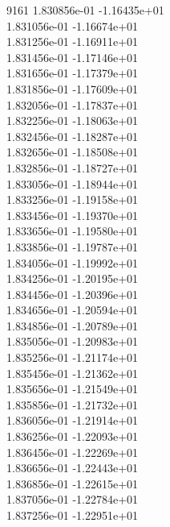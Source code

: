 9161	1.830856e-01	-1.16435e+01	\\ 	1.831056e-01	-1.16674e+01	\\ 	1.831256e-01	-1.16911e+01	\\ 	1.831456e-01	-1.17146e+01	\\ 	1.831656e-01	-1.17379e+01	\\ 	1.831856e-01	-1.17609e+01	\\ 	1.832056e-01	-1.17837e+01	\\ 	1.832256e-01	-1.18063e+01	\\ 	1.832456e-01	-1.18287e+01	\\ 	1.832656e-01	-1.18508e+01	\\ 	1.832856e-01	-1.18727e+01	\\ 	1.833056e-01	-1.18944e+01	\\ 	1.833256e-01	-1.19158e+01	\\ 	1.833456e-01	-1.19370e+01	\\ 	1.833656e-01	-1.19580e+01	\\ 	1.833856e-01	-1.19787e+01	\\ 	1.834056e-01	-1.19992e+01	\\ 	1.834256e-01	-1.20195e+01	\\ 	1.834456e-01	-1.20396e+01	\\ 	1.834656e-01	-1.20594e+01	\\ 	1.834856e-01	-1.20789e+01	\\ 	1.835056e-01	-1.20983e+01	\\ 	1.835256e-01	-1.21174e+01	\\ 	1.835456e-01	-1.21362e+01	\\ 	1.835656e-01	-1.21549e+01	\\ 	1.835856e-01	-1.21732e+01	\\ 	1.836056e-01	-1.21914e+01	\\ 	1.836256e-01	-1.22093e+01	\\ 	1.836456e-01	-1.22269e+01	\\ 	1.836656e-01	-1.22443e+01	\\ 	1.836856e-01	-1.22615e+01	\\ 	1.837056e-01	-1.22784e+01	\\ 	1.837256e-01	-1.22951e+01	\\ \hline
